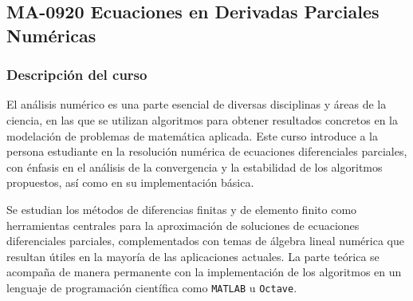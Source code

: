 \newpage
\subsection*{MA-0920 Ecuaciones en Derivadas Parciales Numéricas}

\hypertarget{MA0920}{}
\begin{refsection}
\begin{table}[H]
\end{table}

\subsubsection*{Descripción del curso}

El análisis numérico es una parte esencial de diversas disciplinas y áreas de la ciencia, en las que se utilizan algoritmos para obtener resultados concretos en la modelación de problemas de matemática aplicada. Este curso introduce a la persona estudiante en la resolución numérica de ecuaciones diferenciales parciales, con énfasis en el análisis de la convergencia y la estabilidad de los algoritmos propuestos, así como en su implementación básica.

Se estudian los métodos de diferencias finitas y de elemento finito como herramientas centrales para la aproximación de soluciones de ecuaciones diferenciales parciales, complementados con temas de álgebra lineal numérica que resultan útiles en la mayoría de las aplicaciones actuales. La parte teórica se acompaña de manera permanente con la implementación de los algoritmos en un lenguaje de programación científica como \texttt{MATLAB} u \texttt{Octave}.


\end{refsection}
